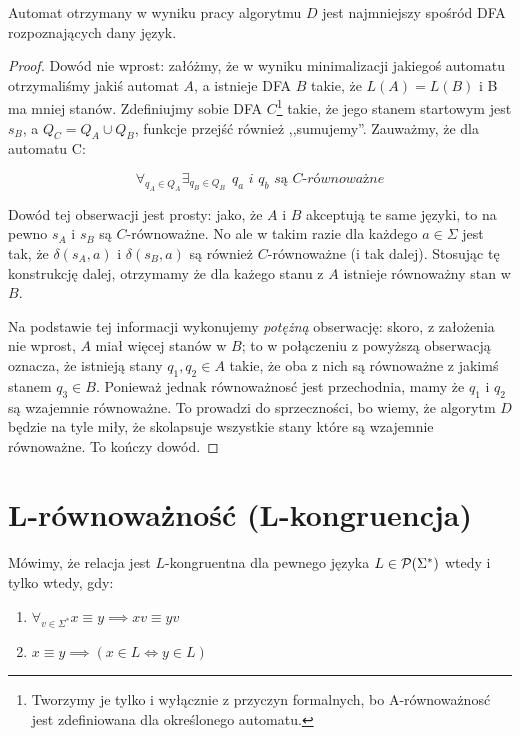 \begin{theorem}
    Automat otrzymany w wyniku pracy algorytmu \(D\) jest najmniejszy spośród DFA rozpoznających dany język.
\end{theorem}
\begin{proof}
    Dowód nie wprost: załóżmy, że w wyniku minimalizacji jakiegoś automatu otrzymaliśmy jakiś automat \(A\), a istnieje DFA \(B\) takie, że \( L(A) = L(B) \) i B ma mniej stanów. Zdefiniujmy sobie DFA \(C\)\footnote{Tworzymy je tylko i wyłącznie z przyczyn formalnych, bo A-równoważnosć jest zdefiniowana dla określonego automatu.} takie, że jego stanem startowym jest \(s_B\), a \(Q_C = Q_A \cup Q_B\), funkcje przejść również ,,sumujemy''. Zauważmy, że dla automatu C:
    
    \[
        \forall_{q_A \in Q_A} \exists_{q_B \in Q_B}  \hspace{5pt} \textit{\(q_a\) i \(q_b\) są \(C\)-równoważne}
    \]
    
    Dowód tej obserwacji jest prosty: jako, że \(A\) i \(B\) akceptują te same języki, to na pewno \(s_A\) i \(s_B\) są \(C\)-równoważne. No ale w takim razie dla każdego \(a \in \Sigma\) jest tak, że \(\delta(s_A, a)\) i \(\delta(s_B, a)\) są również \(C\)-równoważne (i tak dalej). Stosując tę konstrukcję dalej, otrzymamy że dla każego stanu z \(A\) istnieje równoważny stan w \(B\). 
    
    Na podstawie tej informacji wykonujemy \textit{potężną} obserwację: skoro, z założenia nie wprost, \(A\) miał więcej stanów w \(B\); to w połączeniu z powyższą obserwacją oznacza, że istnieją stany \(q_1, q_2 \in A\) takie, że oba z nich są równoważne z jakimś stanem \(q_3 \in B\). Ponieważ jednak równoważnosć jest przechodnia, mamy że \(q_1\) i \(q_2\) są wzajemnie równoważne. To prowadzi do sprzeczności, bo wiemy, że algorytm \(D\) będzie na tyle miły, że skolapsuje wszystkie stany które są wzajemnie równoważne. To kończy dowód. 
    
\end{proof}

\section{L-równoważność (L-kongruencja)}

\begin{definition}
    Mówimy, że relacja jest \(L\)-kongruentna dla pewnego języka \(L \in \operatorname{\mathcal{P}}(\Sigma^*)\) wtedy i tylko wtedy, gdy:
    \begin{enumerate}
        \item \(\forall_{v \in \Sigma^*} x \equiv y \implies xv \equiv yv \)
        \item \( x \equiv y \implies (x \in L \iff y \in L)\)
    \end{enumerate}
\end{definition}

